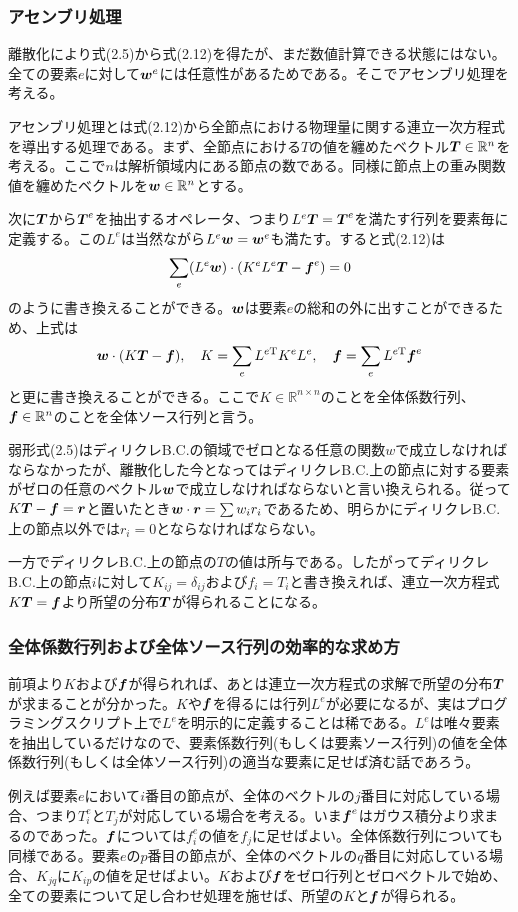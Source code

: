 \documentclass[dvipdfmx, 9pt, a4paper]{jsarticle}
\numberwithin{equation}{section}
\newcommand{\bm}[1]{{\mbox{\boldmath $#1$}}}
\begin{document}
\subsubsection{アセンブリ処理}
離散化により式(2.5)から式(2.12)を得たが、まだ数値計算できる状態にはない。全ての要素$e$に対して$\bm w^e$には任意性があるためである。そこでアセンブリ処理を考える。\par
アセンブリ処理とは式(2.12)から全節点における物理量に関する連立一次方程式を導出する処理である。まず、全節点における$T$の値を纏めたベクトル$\bm T \in \mathbb{R}^n$を考える。ここで$n$は解析領域内にある節点の数である。同様に節点上の重み関数値を纏めたベクトルを$\bm w \in \mathbb{R}^n$とする。\par
次に$\bm T$から$\bm T^e$を抽出するオペレータ、つまり$L^e\bm T = \bm T^e$を満たす行列を要素毎に定義する。この$L^e$は当然ながら$L^e\bm w=\bm w^e$も満たす。すると式(2.12)は
\begin{equation}
\sum_e (L^e\bm w) \cdot (K^eL^e\bm T - \bm f^e) = 0 \notag
\end{equation}
のように書き換えることができる。$\bm w$は要素$e$の総和の外に出すことができるため、上式は
\begin{equation}
\bm w \cdot (K\bm T - \bm f),~~~K=\sum_eL^{e\rm T}K^eL^e,~~~\bm f=\sum_eL^{e\rm T}\bm f^e \notag
\end{equation}
と更に書き換えることができる。ここで$K \in \mathbb{R}^{n \times n}$のことを全体係数行列、$\bm f \in \mathbb{R}^n$のことを全体ソース行列と言う。\par
弱形式(2.5)はディリクレB.C.の領域でゼロとなる任意の関数$w$で成立しなければならなかったが、離散化した今となってはディリクレB.C.上の節点に対する要素がゼロの任意のベクトル$\bm w$で成立しなければならないと言い換えられる。従って$K\bm T - \bm f = \bm r$と置いたとき$\bm w \cdot \bm r=\sum w_i r_i$であるため、明らかにディリクレB.C.上の節点以外では$r_i=0$とならなければならない。\par
一方でディリクレB.C.上の節点の$T$の値は所与である。したがってディリクレB.C.上の節点$i$に対して$K_{ij}=\delta_{ij}$および$f_i=T_i$と書き換えれば、連立一次方程式$K\bm T=\bm f$より所望の分布$\bm T$が得られることになる。

\subsubsection{全体係数行列および全体ソース行列の効率的な求め方}
前項より$K$および$\bm f$が得られれば、あとは連立一次方程式の求解で所望の分布$\bm T$が求まることが分かった。$K$や$\bm f$を得るには行列$L^e$が必要になるが、実はプログラミングスクリプト上で$L^e$を明示的に定義することは稀である。$L^e$は唯々要素を抽出しているだけなので、要素係数行列(もしくは要素ソース行列)の値を全体係数行列(もしくは全体ソース行列)の適当な要素に足せば済む話であろう。\par
例えば要素$e$において$i$番目の節点が、全体のベクトルの$j$番目に対応している場合、つまり$T^e_i$と$T_j$が対応している場合を考える。いま$\bm f^e$はガウス積分より求まるのであった。$\bm f$については$f^e_i$の値を$f_j$に足せばよい。全体係数行列についても同様である。要素$e$の$p$番目の節点が、全体のベクトルの$q$番目に対応している場合、$K_{jq}$に$K_{ip}$の値を足せばよい。$K$および$\bm f$をゼロ行列とゼロベクトルで始め、全ての要素について足し合わせ処理を施せば、所望の$K$と$\bm f$が得られる。
\end{document}
